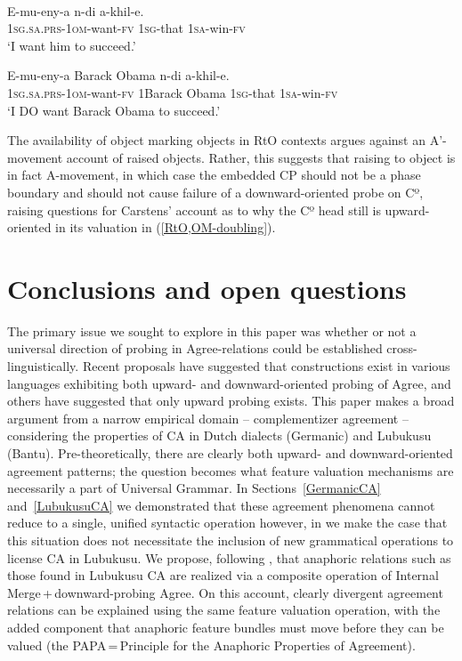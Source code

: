 \documentclass[output=paper
,modfonts
,nonflat
]{langsci/langscibook}
\begin{document}
\pagebreak
\ea
{}\\
\begin{xlist}

\ex \label{OMedRtOObject}
\gll E-mu-eny-a n-di a-khil-e. \\
1\textsc{sg}.\textsc{sa}.\textsc{prs}-1\textsc{om}-want-\textsc{fv} 1\textsc{sg}-that 1\textsc{sa}-win-\textsc{fv}\\
\glt `I want him to succeed.'

\ex \label{RtO,OM-doubling}
\gll E-mu-eny-a Barack Obama n-di a-khil-e.\\
1\textsc{sg}.\textsc{sa}.\textsc{prs}-1\textsc{om}-want-\textsc{fv} 1Barack Obama 1\textsc{sg}-that 1\textsc{sa}-win-\textsc{fv} \\
\glt `I DO want Barack Obama to succeed.'

\end{xlist}
\z
\noindent The availability of object marking objects in RtO contexts argues against an A’-movement account of raised objects. Rather, this suggests that raising to object is in fact A-movement, in which case the embedded CP should not be a phase boundary and should not cause failure of a downward-oriented probe on Cº, raising questions for Carstens’ account as to why the Cº head still is upward-oriented in its valuation in (\ref{RtO,OM-doubling}).

\section{Conclusions and open questions}

The primary issue we sought to explore in this paper was whether or not a universal direction of probing in Agree-relations could be established cross-linguis\-tically. Recent proposals have suggested that constructions exist in various languages exhibiting both upward- and downward-oriented probing of Agree, and others have suggested that only upward probing exists. This paper makes a broad argument from a narrow empirical domain -- complementizer agreement -- considering the properties of CA in Dutch dialects (Germanic) and Lubukusu (Bantu). Pre-theoretically, there are clearly both upward- and downward-oriented agreement patterns; the question becomes what feature valuation mechanisms are necessarily a part of Universal Grammar. In Sections~\ref{GermanicCA} and~\ref{LubukusuCA} we demonstrated that these agreement phenomena cannot reduce to a single, unified syntactic operation  however, in  we make the case that this situation does not necessitate the inclusion of new grammatical operations to license CA in Lubukusu. We propose, following \citet{Rooryck:2011}, that anaphoric relations such as those found in Lubukusu CA are realized via a composite operation of Internal Merge\,+\,downward-probing Agree. On this account, clearly divergent agreement relations can be explained using the same feature valuation operation, with the added component that anaphoric feature bundles must move before they can be valued (the PAPA\,=\,Principle for the Anaphoric Properties of Agreement). 
\end{document}
